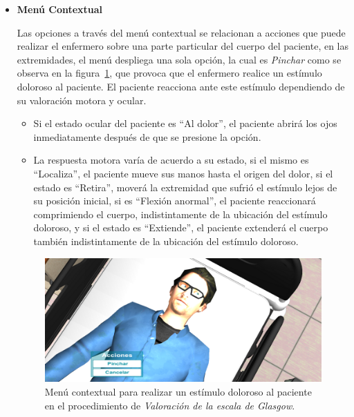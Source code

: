 \begin{itemize}
\item{\textbf{Menú Contextual}}

Las opciones a través del menú contextual se relacionan a acciones que puede
realizar el enfermero sobre una parte particular del cuerpo del paciente, en las
extremidades, el menú despliega una sola opción, la cual es \emph{Pinchar} como se 
observa en la figura~\ref{fig:glasgow_menu_accion}, que
provoca que el enfermero realice un estímulo doloroso al paciente. El
paciente reacciona ante este estímulo dependiendo de su valoración motora y
ocular. 

\begin{itemize}
    \item Si el estado ocular del paciente es \enquote{Al dolor}, el paciente
        abrirá los ojos inmediatamente después de que se presione la opción. 
    \item  La respuesta motora varía de acuerdo a su estado, si el mismo es
        \enquote{Localiza}, el paciente mueve sus manos hasta el origen del
        dolor, si el estado es \enquote{Retira}, moverá la extremidad que
        sufrió el estímulo lejos de su posición inicial, si es
        \enquote{Flexión anormal}, el paciente reaccionará comprimiendo el
        cuerpo, indistintamente de la ubicación del estímulo doloroso, y si el
        estado es \enquote{Extiende}, el paciente extenderá el cuerpo también 
        indistintamente de la ubicación del estímulo doloroso.
\end{itemize}

\begin{figure}[H]
\centering
\includegraphics[scale=0.5]{solucion/images/glasgow_menu_accion.png}
\caption{Menú contextual para realizar un estímulo doloroso al paciente en el procedimiento de 
\emph{Valoración de la escala de Glasgow}.}
\label{fig:glasgow_menu_accion}
\end{figure}


\end{itemize}

